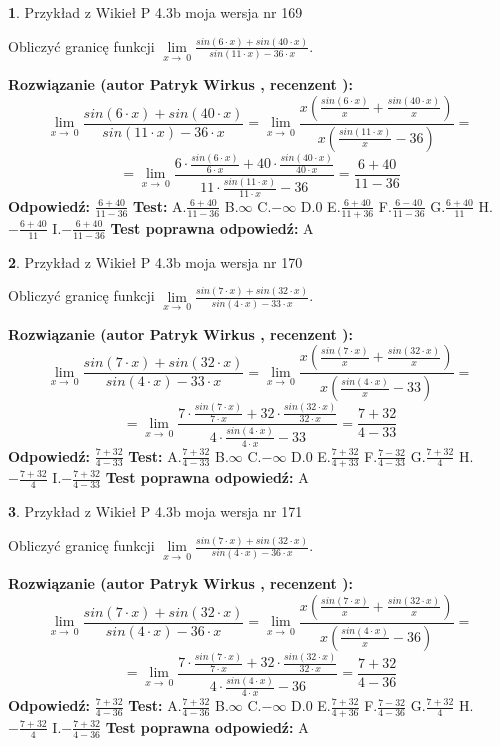 \documentclass[12pt, a4paper]{article}
\theoremstyle{definition} %
\newtheorem{zad}{}
\newcommand{\zadStart}[1]{\begin{zad}#1\newline}
\newcommand{\zadStop}{\end{zad}}
\newcommand{\rozwStart}[2]{\noindent \textbf{Rozwiązanie (autor #1 , recenzent #2): }\newline}
\newcommand{\rozwStop}{\newline}
\newcommand{\odpStart}{\noindent \textbf{Odpowiedź:}\newline}
\newcommand{\odpStop}{\newline}
\newcommand{\testStart}{\noindent \textbf{Test:}\newline}
\newcommand{\testStop}{\newline}
\newcommand{\kluczStart}{\noindent \textbf{Test poprawna odpowiedź:}\newline}
\newcommand{\kluczStop}{\newline}
\begin{document}
\zadStart{Przykład z Wikieł P 4.3b moja wersja nr 169}


Obliczyć granicę funkcji $\lim\limits_{x\to\ 0}\frac{sin(6 \cdot x)+sin(40 \cdot x)}{sin(11 \cdot x)-36 \cdot x}$.
\zadStop
\rozwStart{Patryk Wirkus}{}
$$\lim\limits_{x\to\ 0}\frac{sin(6 \cdot x)+sin(40 \cdot x)}{sin(11 \cdot x)-36 \cdot x}=\lim\limits_{x\to\ 0}\frac{x(\frac{sin(6 \cdot x)}{x}+\frac{sin(40 \cdot x)}{x})}{x(\frac{sin(11 \cdot x)}{x}-36)}=$$
$$=\lim\limits_{x\to\ 0}\frac{6 \cdot \frac{sin(6 \cdot x)}{6 \cdot x}+40 \cdot \frac{sin(40 \cdot x)}{40 \cdot x}}{11 \cdot \frac{sin(11 \cdot x)}{11 \cdot x}-36}=\frac{6+40}{11-36}$$
\rozwStop
\odpStart
$\frac{6+40}{11-36}$
\odpStop
\testStart
A.$\frac{6+40}{11-36}$
B.$\infty$
C.$-\infty$
D.$0$
E.$\frac{6+40}{11+36}$
F.$\frac{6-40}{11-36}$
G.$\frac{6+40}{11}$
H.$-\frac{6+40}{11}$
I.$-\frac{6+40}{11-36}$
\testStop
\kluczStart
A
\kluczStop



\zadStart{Przykład z Wikieł P 4.3b moja wersja nr 170}


Obliczyć granicę funkcji $\lim\limits_{x\to\ 0}\frac{sin(7 \cdot x)+sin(32 \cdot x)}{sin(4 \cdot x)-33 \cdot x}$.
\zadStop
\rozwStart{Patryk Wirkus}{}
$$\lim\limits_{x\to\ 0}\frac{sin(7 \cdot x)+sin(32 \cdot x)}{sin(4 \cdot x)-33 \cdot x}=\lim\limits_{x\to\ 0}\frac{x(\frac{sin(7 \cdot x)}{x}+\frac{sin(32 \cdot x)}{x})}{x(\frac{sin(4 \cdot x)}{x}-33)}=$$
$$=\lim\limits_{x\to\ 0}\frac{7 \cdot \frac{sin(7 \cdot x)}{7 \cdot x}+32 \cdot \frac{sin(32 \cdot x)}{32 \cdot x}}{4 \cdot \frac{sin(4 \cdot x)}{4 \cdot x}-33}=\frac{7+32}{4-33}$$
\rozwStop
\odpStart
$\frac{7+32}{4-33}$
\odpStop
\testStart
A.$\frac{7+32}{4-33}$
B.$\infty$
C.$-\infty$
D.$0$
E.$\frac{7+32}{4+33}$
F.$\frac{7-32}{4-33}$
G.$\frac{7+32}{4}$
H.$-\frac{7+32}{4}$
I.$-\frac{7+32}{4-33}$
\testStop
\kluczStart
A
\kluczStop



\zadStart{Przykład z Wikieł P 4.3b moja wersja nr 171}


Obliczyć granicę funkcji $\lim\limits_{x\to\ 0}\frac{sin(7 \cdot x)+sin(32 \cdot x)}{sin(4 \cdot x)-36 \cdot x}$.
\zadStop
\rozwStart{Patryk Wirkus}{}
$$\lim\limits_{x\to\ 0}\frac{sin(7 \cdot x)+sin(32 \cdot x)}{sin(4 \cdot x)-36 \cdot x}=\lim\limits_{x\to\ 0}\frac{x(\frac{sin(7 \cdot x)}{x}+\frac{sin(32 \cdot x)}{x})}{x(\frac{sin(4 \cdot x)}{x}-36)}=$$
$$=\lim\limits_{x\to\ 0}\frac{7 \cdot \frac{sin(7 \cdot x)}{7 \cdot x}+32 \cdot \frac{sin(32 \cdot x)}{32 \cdot x}}{4 \cdot \frac{sin(4 \cdot x)}{4 \cdot x}-36}=\frac{7+32}{4-36}$$
\rozwStop
\odpStart
$\frac{7+32}{4-36}$
\odpStop
\testStart
A.$\frac{7+32}{4-36}$
B.$\infty$
C.$-\infty$
D.$0$
E.$\frac{7+32}{4+36}$
F.$\frac{7-32}{4-36}$
G.$\frac{7+32}{4}$
H.$-\frac{7+32}{4}$
I.$-\frac{7+32}{4-36}$
\testStop
\kluczStart
A
\kluczStop
\end{document}
